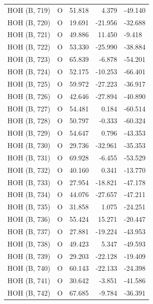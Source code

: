 \begin{longtable}{@{}lcrr@{}}
  \cmidrule(r){1-5}
  HOH (B, 719) & O & 51.818 & 4.379 & -49.140 \\
  \cmidrule(r){1-5}
  HOH (B, 720) & O & 19.691 & -21.956 & -32.688 \\
  \cmidrule(r){1-5}
  HOH (B, 721) & O & 49.886 & 11.450 & -9.418 \\
  \cmidrule(r){1-5}
  HOH (B, 722) & O & 53.330 & -25.990 & -38.884 \\
  \cmidrule(r){1-5}
  HOH (B, 723) & O & 65.839 & -6.878 & -54.201 \\
  \cmidrule(r){1-5}
  HOH (B, 724) & O & 52.175 & -10.253 & -66.401 \\
  \cmidrule(r){1-5}
  HOH (B, 725) & O & 59.972 & -27.223 & -36.917 \\
  \cmidrule(r){1-5}
  HOH (B, 726) & O & 42.646 & -27.894 & -40.890 \\
  \cmidrule(r){1-5}
  HOH (B, 727) & O & 54.481 & 0.184 & -60.514 \\
  \cmidrule(r){1-5}
  HOH (B, 728) & O & 50.797 & -0.333 & -60.324 \\
  \cmidrule(r){1-5}
  HOH (B, 729) & O & 54.647 & 0.796 & -43.353 \\
  \cmidrule(r){1-5}
  HOH (B, 730) & O & 29.736 & -32.961 & -35.353 \\
  \cmidrule(r){1-5}
  HOH (B, 731) & O & 69.928 & -6.455 & -53.529 \\
  \cmidrule(r){1-5}
  HOH (B, 732) & O & 40.160 & 0.341 & -13.770 \\
  \cmidrule(r){1-5}
  HOH (B, 733) & O & 27.954 & -18.821 & -47.178 \\
  \cmidrule(r){1-5}
  HOH (B, 734) & O & 44.076 & -27.657 & -47.211 \\
  \cmidrule(r){1-5}
  HOH (B, 735) & O & 31.858 & 1.075 & -24.251 \\
  \cmidrule(r){1-5}
  HOH (B, 736) & O & 55.424 & 15.271 & -20.447 \\
  \cmidrule(r){1-5}
  HOH (B, 737) & O & 27.881 & -19.224 & -43.953 \\
  \cmidrule(r){1-5}
  HOH (B, 738) & O & 49.423 & 5.347 & -49.593 \\
  \cmidrule(r){1-5}
  HOH (B, 739) & O & 29.203 & -22.128 & -19.409 \\
  \cmidrule(r){1-5}
  HOH (B, 740) & O & 60.143 & -22.133 & -24.398 \\
  \cmidrule(r){1-5}
  HOH (B, 741) & O & 30.642 & -3.851 & -41.586 \\
  \cmidrule(r){1-5}
  HOH (B, 742) & O & 67.685 & -9.784 & -36.391 \\

\end{longtable}
